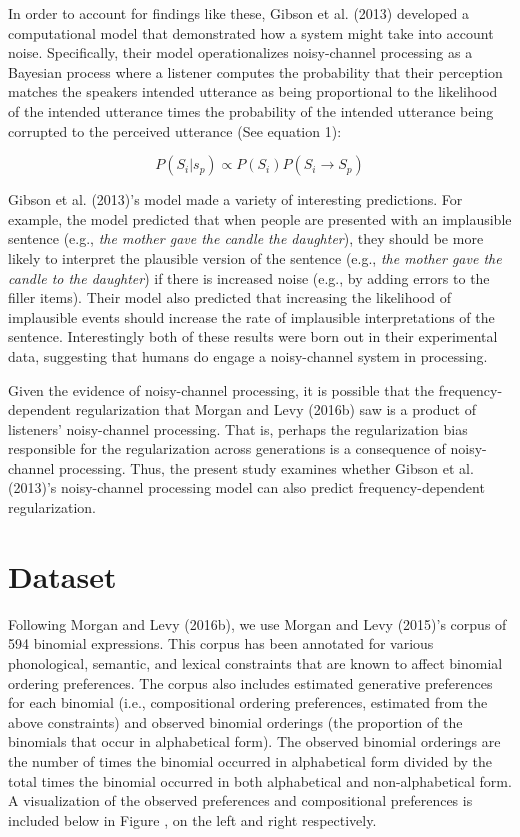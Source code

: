 \documentclass[
  jou,floatsintext]{apa6}
\begin{document}
In order to account for findings like these, Gibson et al. (2013) developed a computational model that demonstrated how a system might take into account noise. Specifically, their model operationalizes noisy-channel processing as a Bayesian process where a listener computes the probability that their perception matches the speakers intended utterance as being proportional to the likelihood of the intended utterance times the probability of the intended utterance being corrupted to the perceived utterance (See equation 1):

\begin{equation}
\label{eq:gibsonnoisy}
P(S_i|s_p) \propto P(S_i) P(S_i \to S_p)
\end{equation}

Gibson et al. (2013)'s model made a variety of interesting predictions. For example, the model predicted that when people are presented with an implausible sentence (e.g., \emph{the mother gave the candle the daughter}), they should be more likely to interpret the plausible version of the sentence (e.g., \emph{the mother gave the candle to the daughter}) if there is increased noise (e.g., by adding errors to the filler items). Their model also predicted that increasing the likelihood of implausible events should increase the rate of implausible interpretations of the sentence. Interestingly both of these results were born out in their experimental data, suggesting that humans do engage a noisy-channel system in processing.

Given the evidence of noisy-channel processing, it is possible that the frequency-dependent regularization that Morgan and Levy (2016b) saw is a product of listeners' noisy-channel processing. That is, perhaps the regularization bias responsible for the regularization across generations is a consequence of noisy-channel processing. Thus, the present study examines whether Gibson et al. (2013)'s noisy-channel processing model can also predict frequency-dependent regularization.

\section{Dataset}\label{dataset}

Following Morgan and Levy (2016b), we use Morgan and Levy (2015)'s corpus of 594 binomial expressions. This corpus has been annotated for various phonological, semantic, and lexical constraints that are known to affect binomial ordering preferences. The corpus also includes estimated generative preferences for each binomial (i.e., compositional ordering preferences, estimated from the above constraints) and observed binomial orderings (the proportion of the binomials that occur in alphabetical form). The observed binomial orderings are the number of times the binomial occurred in alphabetical form divided by the total times the binomial occurred in both alphabetical and non-alphabetical form. A visualization of the observed preferences and compositional preferences is included below in Figure , on the left and right respectively.
\end{document}
